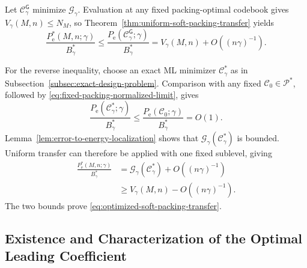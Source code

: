\documentclass[12pt,draftclsnofoot,onecolumn]{IEEEtran}
\newcommand{\cC}{\mathcal{C}}
\newcommand{\cG}{\mathcal{G}}
\newcommand{\cP}{\mathcal{P}}
\newcommand{\Pe}{P_{\mathrm e}}
\theoremstyle{definition}
\begin{document}
\begin{IEEEproof}
Let \(\cC_\gamma^{\mathsf G}\) minimize \(\cG_\gamma\).  Evaluation at
any fixed packing-optimal codebook gives \(V_\gamma(M,n)\le N_M\), so
Theorem~\ref{thm:uniform-soft-packing-transfer} yields
\begin{equation*}
  \frac{\Pe^{\ast}(M,n;\gamma)}{B_\gamma^{\ast}}
  \le\frac{\Pe(\cC_\gamma^{\mathsf G};\gamma)}{B_\gamma^{\ast}}
  =V_\gamma(M,n)+O((n\gamma)^{-1}).
\end{equation*}

For the reverse inequality, choose an exact ML minimizer
\(\cC_\gamma^{\ast}\) as in
Subsection~\ref{subsec:exact-design-problem}.  Comparison with any fixed
\(\cC_0\in\cP^{\ast}\), followed by
\eqref{eq:fixed-packing-normalized-limit}, gives
\begin{equation*}
  \frac{\Pe(\cC_\gamma^{\ast};\gamma)}{B_\gamma^{\ast}}
  \le\frac{\Pe(\cC_0;\gamma)}{B_\gamma^{\ast}}=O(1).
\end{equation*}
Lemma~\ref{lem:error-to-energy-localization} shows that
\(\cG_\gamma(\cC_\gamma^{\ast})\) is bounded.  Uniform transfer can
therefore be applied with one fixed sublevel, giving
\begin{equation*}
\begin{aligned}
  \frac{\Pe^{\ast}(M,n;\gamma)}{B_\gamma^{\ast}}
  &=\cG_\gamma(\cC_\gamma^{\ast})+O((n\gamma)^{-1})\\
  &\ge V_\gamma(M,n)-O((n\gamma)^{-1}).
\end{aligned}
\end{equation*}
The two bounds prove \eqref{eq:optimized-soft-packing-transfer}.
\end{IEEEproof}

\subsection{Existence and Characterization of the Optimal Leading Coefficient}
\end{document}
